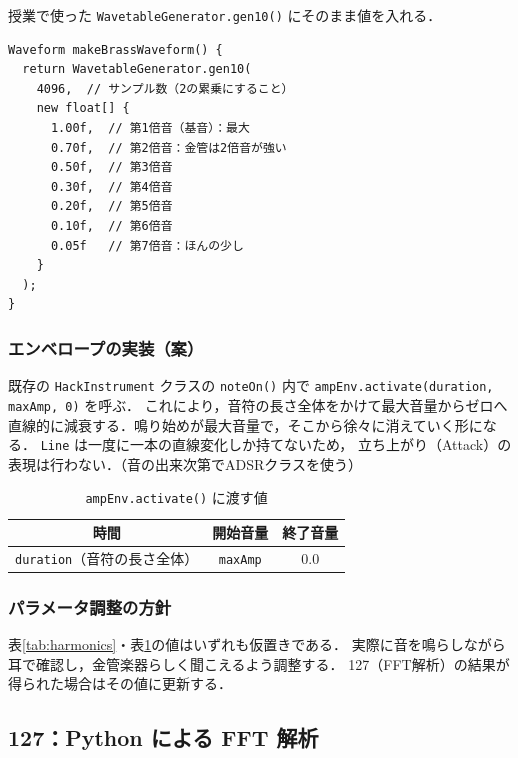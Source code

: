\documentclass[a4paper,12pt]{jsarticle}
\begin{document}
授業で使った \texttt{WavetableGenerator.gen10()} にそのまま値を入れる．

\begin{lstlisting}[style=processing, caption={金管楽器風の波形生成（案）}]
Waveform makeBrassWaveform() {
  return WavetableGenerator.gen10(
    4096,  // サンプル数（2の累乗にすること）
    new float[] {
      1.00f,  // 第1倍音（基音）：最大
      0.70f,  // 第2倍音：金管は2倍音が強い
      0.50f,  // 第3倍音
      0.30f,  // 第4倍音
      0.20f,  // 第5倍音
      0.10f,  // 第6倍音
      0.05f   // 第7倍音：ほんの少し
    }
  );
}
\end{lstlisting}

\subsubsection{エンベロープの実装（案）}

既存の \texttt{HackInstrument} クラスの \texttt{noteOn()} 内で
\texttt{ampEnv.activate(duration, maxAmp, 0)} を呼ぶ．
これにより，音符の長さ全体をかけて最大音量からゼロへ直線的に減衰する．鳴り始めが最大音量で，そこから徐々に消えていく形になる．
\texttt{Line} は一度に一本の直線変化しか持てないため，
立ち上がり（Attack）の表現は行わない．（音の出来次第でADSRクラスを使う）

 
\begin{table}[h]
  \centering
  \caption{\texttt{ampEnv.activate()} に渡す値}
  \label{tab:line-params}
  \begin{tabular}{ccc}
    \toprule
    時間 & 開始音量 & 終了音量 \\
    \midrule
    \texttt{duration}（音符の長さ全体） & \texttt{maxAmp} & 0.0 \\
    \bottomrule
  \end{tabular}
\end{table}

 
\subsubsection{パラメータ調整の方針}
 
表\ref{tab:harmonics}・表\ref{tab:line-params}の値はいずれも仮置きである．
実際に音を鳴らしながら耳で確認し，金管楽器らしく聞こえるよう調整する．
127（FFT解析）の結果が得られた場合はその値に更新する．

\subsection{127：Python による FFT 解析}
\label{sec:detail-127}
\end{document}
